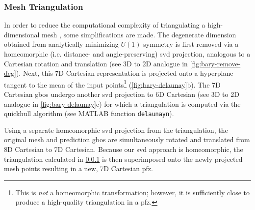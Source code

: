 \documentclass[preprint,12pt]{elsarticle}
\begin{document}
\subsubsection{Mesh Triangulation}
\label{sec:methods:bary:tri}
In order to reduce the computational complexity of triangulating a high-dimensional mesh \cite{barberQuickhullAlgorithmConvex1996}, some simplifications are made. The degenerate dimension obtained from analytically minimizing $U(1)$ symmetry \cite{francisGeodesicOctonionMetric2019} is first removed via a homeomorphic (i.e. distance- and angle-preserving) \gls{svd} projection,
analogous to a Cartesian rotation and translation
(see 3D to 2D analogue in \cref{fig:bary-remove-deg}). Next, this 7D Cartesian representation is projected onto a hyperplane tangent to the mean of the input points\footnote{This is \textit{not} a homeomorphic transformation; however, it is sufficiently close to produce a high-quality triangulation in a \gls{pfz}.} (\cref{fig:bary-delaunay}b). The 7D Cartesian \glspl{gbo} undergo another \gls{svd} projection to 6D Cartesian (see 3D to 2D analogue in \cref{fig:bary-delaunay}c) for which a triangulation is computed via the quickhull algorithm \cite{barberQuickhullAlgorithmConvex1996} (see MATLAB function \texttt{delaunayn}).

Using a separate homeomorphic \gls{svd} projection from the triangulation, the original mesh and prediction \glspl{gbo} are simultaneously rotated and translated from 8D Cartesian to 7D Cartesian. Because our \gls{svd} approach is homeomorphic, the triangulation calculated in \cref{sec:methods:bary:tri} is then superimposed onto the newly projected mesh points resulting in a new, 7D Cartesian \gls{pfz}.
\end{document}
